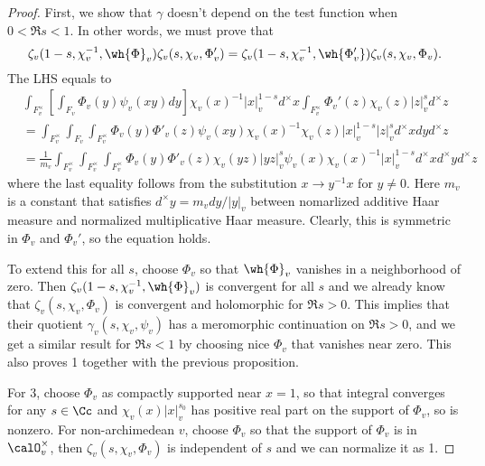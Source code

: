 \begin{proof}
First, we show that $\gamma$ doesn't depend on the test function when $0<\Re s < 1$. In other words, we must prove that 
$$
\zeta_{v}(1-s, \chi_{v}^{-1}, \wh{\Phi}_{v}) \zeta_{v}(s, \chi_{v}, \Phi_{v}') = \zeta_{v}(1-s, \chi_{v}^{-1}, \wh{\Phi_{v}'}) \zeta_{v}(s, \chi_{v}, \Phi_{v}).
$$
The LHS equals to 
\begin{align*}
&\int_{F_{v}^{\times}}\left[ \int_{F_{v}} \Phi_{v}(y) \psi_v(xy)dy\right]\chi_{v}(x)^{-1}|x|_{v}^{1-s} d^{\times}x \int_{F_{v}^{\times}} \Phi_{v}'(z)\chi_{v}(z) |z|_{v}^{s} d^{\times}z \\
&= \int_{F_{v}^{\times}}\int_{F_{v}}\int_{F_{v}^{\times}} \Phi_{v}(y)\Phi'_{v}(z)\psi_v(xy)\chi_{v}(x)^{-1}\chi_{v}(z) |x|_{v}^{1-s}|z|_{v}^{s} d^{\times}x dyd^{\times}z \\
&= \frac{1}{m_{v}} \int_{F_{v}^{\times}}\int_{F_{v}^{\times}}\int_{F_{v}^{\times}} \Phi_{v}(y)\Phi'_{v}(z) \chi_{v}(yz) |yz|_{v}^{s} \psi_v(x) \chi_{v}(x)^{-1} |x|_{v}^{1-s}d^{\times}x d^{\times}y d^{\times} z
\end{align*}
where the last equality follows from the substitution $x\to y^{-1}x$ for $y\neq 0$. Here $m_{v}$ is a constant that satisfies $d^{\times}y = m_{v}dy / |y|_{v}$ between nomarlized additive Haar measure and normalized multiplicative Haar measure.  Clearly, this is symmetric in $\Phi_{v}$ and $\Phi_{v}'$, so the equation holds. 

To extend this for all $s$, choose $\Phi_{v}$ so that $\wh{\Phi}_{v}$  vanishes in a neighborhood of zero. Then $\zeta_{v}(1-s,\chi_{v}^{-1}, \wh{\Phi}_{v})$ is convergent for all $s$ and we already know that $\zeta_{v}(s, \chi_{v}, \Phi_{v})$ is convergent and holomorphic for $\Re s >0$. 
This implies that their quotient $\gamma_{v}(s, \chi_{v}, \psi_{v})$ has a meromorphic continuation on $\Re s> 0$, and we get a similar result for $\Re s <1$ by choosing nice $\Phi_{v}$ that vanishes near zero. This also proves 1 together with the previous proposition. 

For 3, choose $\Phi_{v}$ as compactly supported near $x = 1$, so that integral converges for any $s\in \Cc$ and $\chi_{v}(x) |x|^{s_{0}}_{v}$ has positive real part on the support of $\Phi_{v}$, so is nonzero. For non-archimedean $v$, choose $\Phi_{v}$ so that the support of $\Phi_{v}$ is in $\calO_{v}^{\times}$, then $\zeta_{v}(s, \chi_{v}, \Phi_{v})$ is independent of $s$ and we can normalize it as 1. 
\end{proof}

